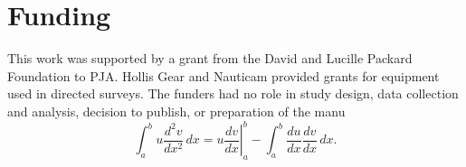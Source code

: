 \section{Funding}
\label{funding} 
This work was supported by a grant from the David and Lucille Packard Foundation to PJA. Hollis Gear and Nauticam provided grants for equipment used in directed surveys. The funders had no role in study design, data collection and analysis, decision to publish, or preparation of the manu
\begin{equation}
\label{eqn:drag}
	\int_a^bu\frac{d^2v}{dx^2}\,dx
	=\left.u\frac{dv}{dx}\right|_a^b
	-\int_a^b\frac{du}{dx}\frac{dv}{dx}\,dx.
\end{equation}
